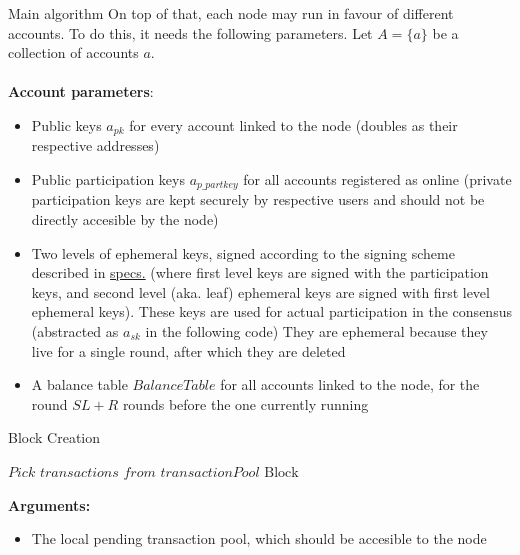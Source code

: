 \documentclass[10pt,a4paper]{article}
\begin{document}
\begin{section}{Main algorithm}
On top of that, each node may run in favour of different accounts. To do this,
it needs the following parameters. 
Let $A=\{a\}$ be a collection of accounts $a$.\\ \\
\noindent \textbf{Account parameters}:
\begin{itemize}
    \item Public keys $a_{pk}$ for every account linked to the node (doubles as their respective addresses)
    \item Public participation keys $a_{p\_partkey}$ for all accounts registered as online (private participation keys are kept
    securely by respective users and should not be directly accesible by the node)
    \item Two levels of ephemeral keys, signed according to the signing scheme described in \href{https://github.com/algorandfoundation/specs}{specs.} (where 
    first level keys are signed with the participation keys, and second level (aka. leaf) ephemeral keys are signed with 
    first level ephemeral keys). 
    These keys are used for actual participation in the consensus (abstracted as $a_{sk}$ in the following code)
    They are ephemeral because they live for a single round, after which they are deleted
    \item A balance table $BalanceTable$ for all accounts linked to the node, for the round $SL + R$ rounds before the one 
    currently running
\end{itemize}


\begin{subsection}{Block Creation}\label{ssect:blockcreation}

\begin{algorithm}
    \begin{algorithmic}[1]
    
    \State $Pick$ $transactions$ $from$ $transactionPool$
    \State \Return $\mathrm{Block}$    
    \EndFunction
    \end{algorithmic}
    \caption{\underline{Block creation}}
\end{algorithm}

\noindent \textbf{Arguments:}
\begin{itemize}
    \item The local pending transaction pool, which should be accesible to the node\\
  \end{itemize}


\end{subsection}
\end{section}
\end{document}
